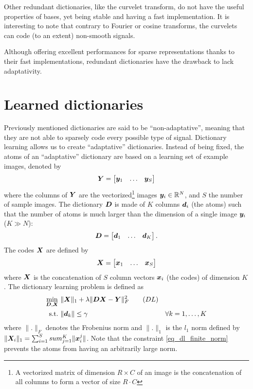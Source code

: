 \noindent
Other redundant dictionaries, like the curvelet transform, do not have the useful properties of bases, yet being stable and having a fast implementation. It is interesting to note that contrary to Fourier or cosine transforms, the curvelets can code (to an extent) non-smooth signals.


\noindent
Although offering excellent performances for sparse representations thanks to their fast implementations, redundant dictionaries have the drawback to lack adaptativity.


\section{Learned dictionaries}
Previously mentioned dictionaries are said to be “non-adaptative”, meaning that they are not able to sparsely code every possible type of signal. Dictionary learning allows us to create “adaptative” dictionaries. Instead of being fixed, the atoms of an “adaptative” dictionary are based on a learning set of example images, denoted by
\begin{equation*}\bm{Y} = \begin{bmatrix} \bm{y}_1 & \dots & \bm{y}_S \end{bmatrix}\end{equation*}
where the columns of $\bm{Y}$ are the vectorized\footnote{A vectorized matrix of dimension $R \times C$ of an image is the concatenation of all columns to form a vector of size $R \cdot C$} images $\bm{y}_i \in \mathbb{R}^N$, and $S$ the number of sample images. The dictionary $\bm{D}$ is made of $K$ columns $\bm{d}_i$ (the atoms) such that the number of atoms is much larger than the dimension of a single image $\bm{y}_i$ ($K \gg N$):
\begin{equation*}\bm{D} = \begin{bmatrix} \bm{d}_1 & \dots & \bm{d}_K \end{bmatrix}.\end{equation*}
The codes $\bm{X}$ are defined by
\begin{equation*}\bm{X} = \begin{bmatrix} \bm{x}_1 & \dots & \bm{x}_{S} \end{bmatrix}\end{equation*}
where $\bm{X}$ is the concatenation of $S$ column vectors $\bm{x}_i$ (the codes) of dimension $K$. The dictionary learning problem is defined as
\begin{align}
\underset{\bm{D},\bm{X}}{\min}~ & \lVert \bm{X} \rVert_1 + \lambda\lVert \bm{D}\bm{X}-\bm{Y} \rVert^2_F \tag{$DL$}\label{eq_dl} \\
\text{s.t.}~ & \lVert \bm{d}_k \rVert \le \gamma & \forall k = 1,\dots,K\label{eq_dl_finite_norm}
\end{align}
where $\lVert . \rVert_F$ denotes the Frobenius norm and $\lVert . \rVert_1$ is the $l_1$ norm defined by $\|\bm{X}_i\|_1  = \sum_{i=1}^S  sum_{j=1}^K \|\bm{x}_i^j \|$.
Note that the constraint \ref{eq_dl_finite_norm} prevents the atoms from having an arbitrarily large norm.

